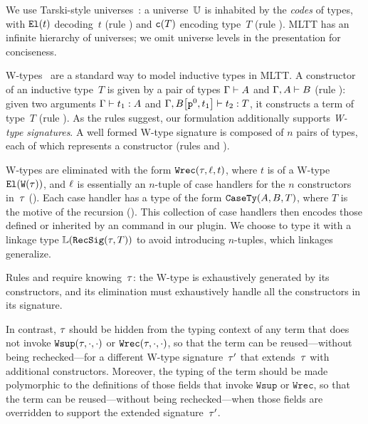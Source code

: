 We use Tarski-style universes~\cite{hofmann1997syntax}: a universe~$\mathbb{U}$
is inhabited by the \emph{codes} of types,
with $\texttt{El}({t})$ decoding~$t$ (rule )
and $\texttt{c}({T})$ encoding type~$T$ (rule ).
MLTT has an infinite hierarchy of universes;
we omit universe levels in the presentation for conciseness.


W-types~\cite{martin1984intuitionistic} are a standard way to model
inductive types in MLTT.
A constructor of an inductive type~$T$ is given by a pair of types
$ {\Gamma} \vdash {A} $ and $ {\Gamma,A} \vdash {B} $ (rule ):
given two arguments $ {\Gamma} \vdash {t_1} : {A} $ and
$ {\Gamma,{B}\!\left[{{\texttt{p}^{0}},{t_1}}\right]} \vdash {t_2} : {T} $,
it constructs a term of type~$T$ (rule ).
As the rules suggest, our formulation additionally supports
\emph{W-type signatures}.
A well formed W-type signature  is
composed of $n$ pairs of types, each of which represents a constructor
(rules  and ).

W-types are eliminated with the form $\texttt{Wrec}({\tau},{\ell},{t})$, where $t$ is of a
W-type $\texttt{El}({\texttt{W}({\tau})})$, and $\ell$ is essentially an $n$-tuple of
case handlers for the $n$ constructors in~$\tau$ ().
Each case handler has a type of the form $\texttt{CaseTy}({A},{B},{T})$, where
$T$ is the motive of the recursion ().
This collection of case handlers then encodes those defined or inherited
by an  command in our plugin.
We choose to type it with a linkage type $\mathbb{L}({\texttt{RecSig}({\tau},{T})})$
to avoid introducing $n$-tuples, which linkages generalize.

Rules  and  require knowing~$\tau$:
the W-type is exhaustively generated by its constructors, and
its elimination must exhaustively handle all the constructors in
its signature.

In contrast, $\tau$ should be hidden from the typing context of any
term that does not invoke $\texttt{Wsup}({\tau},{\cdot},{\cdot})$ or $\texttt{Wrec}({\tau},{\cdot},{\cdot})$, so that
the term can be reused---without being rechecked---for a different
W-type signature~$\tau'$ that extends~$\tau$ with additional
constructors.
Moreover, the typing of the term should be made polymorphic to
the definitions of those fields that invoke $\texttt{Wsup}$ or $\texttt{Wrec}$,
so that the term can be reused---without being rechecked---when those fields
are overridden to support the extended signature~$\tau'$.



